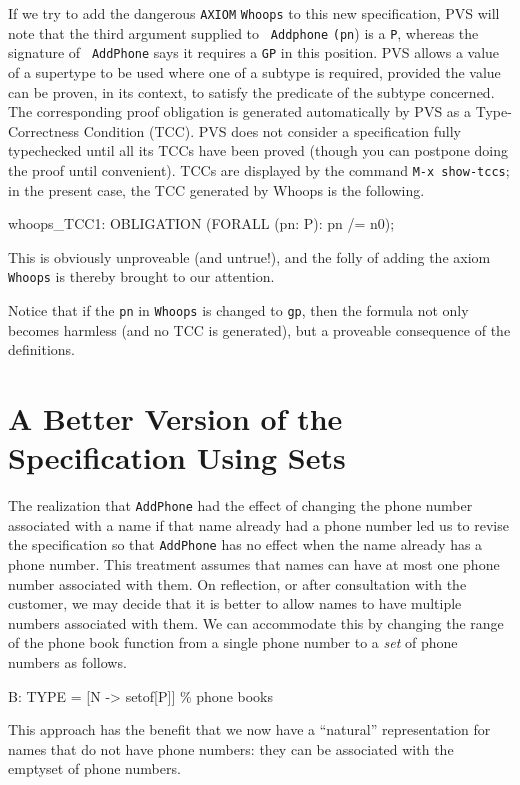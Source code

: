 If we try to add the dangerous {\tt AXIOM} {\tt Whoops} to this new
specification, PVS will note that the third argument supplied to {\tt
Addphone} {\tt (pn}) is a {\tt P}, whereas the signature of {\tt
AddPhone} says it requires a {\tt GP} in this position.  PVS allows a
value of a supertype to be used where one of a subtype is required,
provided the value can be proven, in its context, to satisfy the
predicate of the subtype concerned.  The corresponding proof
obligation is generated automatically by PVS as a Type-Correctness
Condition (TCC).  PVS does not consider a specification fully
typechecked until all its TCCs have been proved (though you can
postpone doing the proof until convenient).  TCCs are displayed by the
command {\tt M-x show-tccs}; in the present case, the TCC generated by
{\rm Whoops} is the following.
\begin{pvsexample}
whoops_TCC1: OBLIGATION (FORALL (pn: P): pn /= n0);
\end{pvsexample}
This is obviously unproveable (and untrue!), and the folly of adding
the axiom {\tt Whoops} is thereby brought to our attention.

Notice that if the {\tt pn} in {\tt Whoops} is changed to {\tt gp},
then the formula not only becomes harmless (and no TCC is generated),
but a proveable consequence of the definitions.

\newpage
{}
\section{A Better Version of the Specification Using Sets}

The realization that {\tt AddPhone} had the effect of changing the
phone number associated with a name if that name already had a phone
number led us to revise the specification so that {\tt AddPhone} has
no effect when the name already has a phone number.  This treatment
assumes that names can have at most one phone number associated with
them.  On reflection, or after consultation with the customer, we may
decide that it is better to allow names to
have multiple numbers associated with them.  We can accommodate this
by changing the range of the phone book function from a single phone
number to a {\em set\/} of phone numbers as follows.
\begin{pvsexample}
B: TYPE = [N -> setof[P]]   \% phone books
\end{pvsexample}
This approach has the benefit that we now have a ``natural''
representation for names that do not have phone numbers: they can be
associated with the emptyset of phone numbers.

